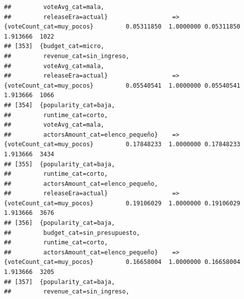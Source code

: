 \documentclass[
]{article}
\begin{document}
\begin{verbatim}
##         voteAvg_cat=mala,                                                                                                       
##         releaseEra=actual}                  => {voteCount_cat=muy_pocos}         0.05311850  1.0000000 0.05311850 1.913666  1022
## [353]  {budget_cat=micro,                                                                                                       
##         revenue_cat=sin_ingreso,                                                                                                
##         voteAvg_cat=mala,                                                                                                       
##         releaseEra=actual}                  => {voteCount_cat=muy_pocos}         0.05540541  1.0000000 0.05540541 1.913666  1066
## [354]  {popularity_cat=baja,                                                                                                    
##         runtime_cat=corto,                                                                                                      
##         voteAvg_cat=mala,                                                                                                       
##         actorsAmount_cat=elenco_pequeño}    => {voteCount_cat=muy_pocos}         0.17848233  1.0000000 0.17848233 1.913666  3434
## [355]  {popularity_cat=baja,                                                                                                    
##         runtime_cat=corto,                                                                                                      
##         actorsAmount_cat=elenco_pequeño,                                                                                        
##         releaseEra=actual}                  => {voteCount_cat=muy_pocos}         0.19106029  1.0000000 0.19106029 1.913666  3676
## [356]  {popularity_cat=baja,                                                                                                    
##         budget_cat=sin_presupuesto,                                                                                             
##         runtime_cat=corto,                                                                                                      
##         actorsAmount_cat=elenco_pequeño}    => {voteCount_cat=muy_pocos}         0.16658004  1.0000000 0.16658004 1.913666  3205
## [357]  {popularity_cat=baja,                                                                                                    
##         revenue_cat=sin_ingreso,                                                                                                

\end{verbatim}
\end{document}
